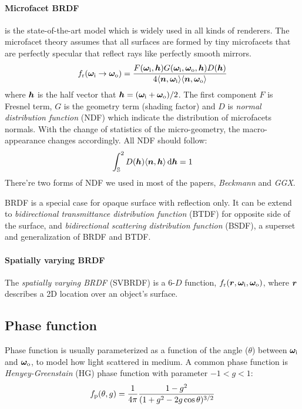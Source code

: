 \paragraph{Microfacet BRDF} is the state-of-the-art model which is widely used in all kinds of renderers. The microfacet theory assumes that all surfaces are formed by tiny microfacets that are perfectly specular that reflect rays like perfectly smooth mirrors.
\begin{equation}
	f_\mathrm{r}(\bm\omega_\mathrm{i}\rightarrow\bm\omega_\mathrm{o}) = 
	\frac{F(\bm\omega_\mathrm{i}, \bm{h}) G(\bm\omega_\mathrm{i},\bm\omega_\mathrm{o},\bm{h}) D(\bm{h})}
	{4{\langle \bm{n},\bm\omega_\mathrm{i} \rangle}{\langle \bm{n},\bm\omega_\mathrm{o} \rangle}}
\end{equation}
where $\bm{h}$ is the half vector that $\bm{h}=(\bm\omega_\mathrm{i}+\bm\omega_\mathrm{o})/2$. The first component $F$ is Fresnel term, $G$ is the geometry term (shading factor) and $D$ is \emph{normal distribution function} (NDF) which indicate the distribution of microfacets normals. With the change of statistics of the micro-geometry, the macro-appearance changes accordingly.
All NDF should follow:
\begin{equation}
	\int_\mathbb{S}^2 D(\bm{h}){\langle \bm{n},\bm{h} \rangle} \,\mathrm{d}\bm{h} = 1
\end{equation}
There're two forms of NDF we used in most of the papers, \emph{Beckmann} and \emph{GGX}.

BRDF is a special case for opaque surface with reflection only. It can be extend to \emph{bidirectional transmittance distribution function} (BTDF) for  opposite side of the surface, and \emph{bidirectional scattering distribution function} (BSDF), a superset and generalization of BRDF and BTDF.

%


\paragraph{Spatially varying BRDF}
The \emph{spatially varying BRDF} (SVBRDF) is a 6-$D$ function, $f_\mathrm{r}(\bm{r},\bm\omega_\mathrm{i},\bm\omega_\mathrm{o})$, where $\bm{r}$ describes a 2D location over an object's surface.


\subsection{Phase function}
Phase function is usually parameterized as a function of the angle ($\theta$) between $\bm\omega_\mathrm{i}$ and $\bm\omega_\mathrm{o}$, to model how light scattered in medium. A common phase function is \emph{Henyey-Greenstain} (HG) phase function with parameter $-1<g<1$:
\begin{equation}
	f_\mathrm{p}(\theta,g) = \frac{1}{4\pi}
	\frac{1-g^2}
	{(1+g^2-2g\cos\theta)^{3/2}}
\end{equation}


